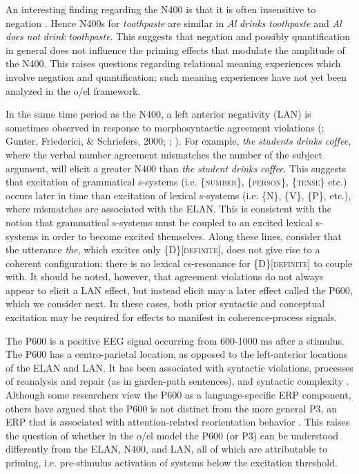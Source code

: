   An interesting finding regarding the N400 is that it is often insensitive to negation \citep{KutasFedermeier2011}. Hence N400s for \textit{toothpaste} are similar in \textit{Al} \textit{drinks} \textit{toothpaste} and \textit{Al} \textit{does} \textit{not} \textit{drink} \textit{toothpaste}. This suggests that negation and possibly quantification in general does not influence the priming effects that modulate the amplitude of the N400. This raises questions regarding relational meaning experiences which involve negation and quantification; such meaning experiences have not yet been analyzed in the o/el framework.

  In the same time period as the N400, a left anterior negativity (LAN) is sometimes observed in response to morphosyntactic agreement violations (\citealt{Friederici2002}; Gunter, Friederici, \& Schriefers, 2000; \citealt{KutasFedermeier2011}; \citealt{OsterhoutHolcomb1992}). For example, \textit{the} \textit{students} \textit{drinks} \textit{coffee}, where the verbal number agreement mismatches the number of the subject argument, will elicit a greater N400 than \textit{the} \textit{student} \textit{drinks} \textit{coffee}. This suggests that excitation of grammatical s-systems (i.e. \{\textsc{number}\}, \{\textsc{person}\}, \{\textsc{tense}\} etc.) occurs later in time than excitation of lexical s-systems (i.e. \{N\}, \{V\}, \{P\}, etc.), where mismatches are associated with the ELAN. This is consistent with the notion that grammatical s-systems must be coupled to an excited lexical s-systems in order to become excited themselves. Along these lines, consider that the utterance \textit{the}, which excites only \{D\}[\textsc{definite}], does not give rise to a coherent configuration: there is no lexical cs-resonance for \{D\}[\textsc{definite}] to couple with. It should be noted, however, that agreement violations do not always appear to elicit a LAN effect, but instead elicit may a later effect called the P600, which we consider next. In these cases, both prior syntactic and conceptual excitation may be required for effects to manifest in coherence-process signals.

  The P600 is a positive EEG signal occurring from 600-1000 ms after a stimulus. The P600 has a centro-parietal location, as opposed to the left-anterior locations of the ELAN and LAN. It has been associated with syntactic violations, processes of reanalysis and repair (as in garden-path sentences), and syntactic complexity \citep{Friederici2002}. Although some researchers view the P600 as a language-specific ERP component, others have argued that the P600 is not distinct from the more general P3, an ERP that is associated with attention-related reorientation behavior \citep{SassenhagenBornkessel-Schlesewsky2015}. This raises the question of whether in the o/el model the P600 (or P3) can be understood differently from the ELAN, N400, and LAN, all of which are attributable to priming, i.e. pre-stimulus activation of systems below the excitation threshold.

